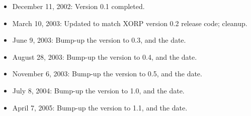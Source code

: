\documentclass[11pt]{article}
\begin{document}
\begin{itemize}

  \item December 11, 2002: Version 0.1 completed.

  \item March 10, 2003: Updated to match XORP version 0.2 release code;
  cleanup.

  \item June 9, 2003: Bump-up the version to 0.3, and the date.

  \item August 28, 2003: Bump-up the version to 0.4, and the date.

  \item November 6, 2003: Bump-up the version to 0.5, and the date.

  \item July 8, 2004: Bump-up the version to 1.0, and the date.

  \item April 7, 2005: Bump-up the version to 1.1, and the date.

\end{itemize}





\end{document}
